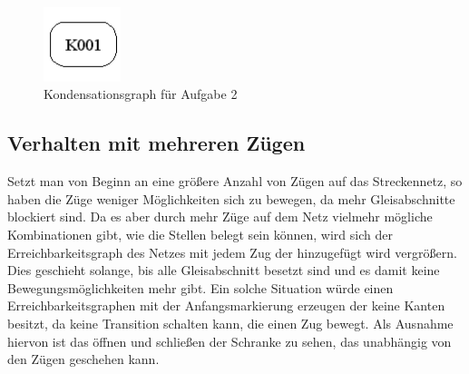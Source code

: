\documentclass[10pt]{scrartcl}
\begin{document}
\begin{figure}[htbp]
	\centering	\includegraphics[width=0.2\textwidth]{Bilder/Aufgabe2_KG.png}
	\caption{Kondensationsgraph für Aufgabe 2}
	\label{fig:KG1}
\end{figure}


\subsection{Verhalten mit mehreren Zügen}
Setzt man von Beginn an eine größere Anzahl von Zügen auf das Streckennetz, so haben die Züge weniger Möglichkeiten sich zu bewegen, da mehr Gleisabschnitte blockiert sind. Da es aber durch mehr Züge auf dem Netz vielmehr mögliche Kombinationen gibt, wie die Stellen belegt sein können, wird sich der Erreichbarkeitsgraph des Netzes mit jedem Zug der hinzugefügt wird vergrößern. Dies geschieht solange, bis alle Gleisabschnitt besetzt sind und es damit keine Bewegungsmöglichkeiten mehr gibt. Ein solche Situation würde einen Erreichbarkeitsgraphen mit der Anfangsmarkierung erzeugen der keine Kanten besitzt, da keine Transition schalten kann, die einen Zug bewegt. Als Ausnahme hiervon ist das öffnen und schließen der Schranke zu sehen, das unabhängig von den Zügen geschehen kann.
 
\end{document}
